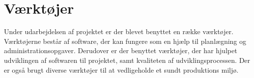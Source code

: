 \section{Værktøjer}

Under udarbejdelsen af projektet er der blevet benyttet en række værktøjer. Værktøjerne består af software, der kan fungere som en hjælp til planlægning og administrationsopgaver. Derudover er der benyttet værktøjer, der har hjulpet udviklingen af softwaren til projektet, samt kvaliteten af udviklingsprocessen. Der er også brugt diverse værktøjer til at vedligeholde et sundt produktions miljø.

\subsection{}
